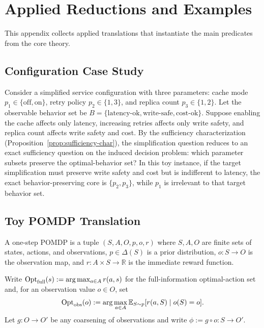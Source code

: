 \section{Applied Reductions and Examples}\label{app:applications}

This appendix collects applied translations that instantiate the main predicates from the core theory.

\subsection{Configuration Case Study}

Consider a simplified service configuration with three parameters: cache mode $p_1\in\{\mathrm{off},\mathrm{on}\}$, retry policy $p_2\in\{1,3\}$, and replica count $p_3\in\{1,2\}$. Let the observable behavior set be $B=\{\mathrm{latency\text{-}ok},\mathrm{write\text{-}safe},\mathrm{cost\text{-}ok}\}$. Suppose enabling the cache affects only latency, increasing retries affects only write safety, and replica count affects write safety and cost. By the sufficiency characterization (Proposition~\ref{prop:sufficiency-char}), the simplification question reduces to an exact sufficiency question on the induced decision problem: which parameter subsets preserve the optimal-behavior set? In this toy instance, if the target simplification must preserve write safety and cost but is indifferent to latency, the exact behavior-preserving core is $\{p_2,p_3\}$, while $p_1$ is irrelevant to that target behavior set. 

\subsection{Toy POMDP Translation}

\begin{definition}\label{def:one-step-pomdp}
A one-step POMDP is a tuple $(S,A,O,p,o,r)$ where $S,A,O$ are finite sets of states, actions, and observations, $p\in\Delta(S)$ is a prior distribution, $o:S\to O$ is the observation map, and $r:A\times S\to\mathbb{R}$ is the immediate reward function.
\end{definition}

Write $\mathrm{Opt}_{\mathrm{full}}(s):=\arg\max_{a\in A} r(a,s)$ for the full-information optimal-action set and, for an observation value $o\in O$, set
\[
\mathrm{Opt}_{\mathrm{obs}}(o):=\arg\max_{a\in A} \mathbb{E}_{S\sim p}[r(a,S)\mid o(S)=o].
\]
Let $g:O\to O'$ be any coarsening of observations and write $\phi:=g\circ o:S\to O'$.


